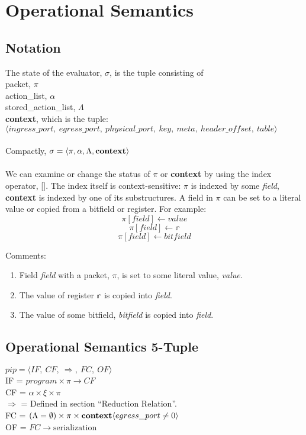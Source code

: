 \documentclass{article}
\begin{document}
\section{Operational Semantics}
\subsection{Notation}
The state of the evaluator, $\sigma$, is the tuple consisting of \\
packet, $\pi$\\
action\_list, $\alpha$ \\
stored\_action\_list, $\Lambda$ \\
\textbf{context}, which is the tuple: \\
$\langle ingress\_port, \ egress\_port, \ physical\_port, \ key, \ meta, \ header\_offset, \ table \rangle$ \\ \\
Compactly, $\sigma = \langle \pi, \alpha, \Lambda, \textbf{\textrm{context}} \rangle$
\\ \\
We can examine or change the status of $\pi$ or \textbf{context} by using the index operator, []. The index itself is context-sensitive: $\pi$ is indexed by some \textit{field}, \textbf{context} is indexed by one of its substructures.
A field in $\pi$ can be set to a literal value or copied from a bitfield or register. For example:
\begin{equation}
  \pi[\textit{field}] \leftarrow \textit{value}
\end{equation}
\begin{equation}
  \pi[\textit{field}] \leftarrow \mathbb{r}
\end{equation}
\begin{equation}
  \pi[\textit{field}] \leftarrow \textit{bitfield}
\end{equation}

Comments:
\begin{enumerate}
\item Field \textit{field} with a packet, $\pi$, is set to some literal value, \textit{value}.
\item The value of register $\mathbb{r}$ is copied into \textit{field}.
\item The value of some bitfield, \textit{bitfield} is copied into \textit{field}.
\end{enumerate}
\subsection{Operational Semantics 5-Tuple}
$ pip = \langle IF, \ CF, \ \Rightarrow, \ FC, \ OF \rangle $\\
IF = $program \times \pi \rightarrow CF$ \\
CF = $\alpha \times \xi \times \pi$ \\
$\Rightarrow$ = Defined in section ``Reduction Relation''. \\
FC = $(\Lambda = \emptyset) \times \pi \times \textbf{\textrm{context}}\langle egress\_port \neq 0 \rangle $ \\
OF = $FC \rightarrow \textrm{serialization}$
\end{document}
